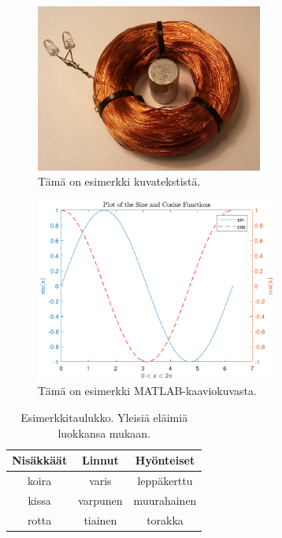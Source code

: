 \documentclass[finnish, 12pt, a4paper, elec, utf8, a-2b, online]{aaltothesis}
\begin{document}
\begin{figure}[htb]
	\centering
	\includegraphics[height=55mm]{./ledspole.jpg}
	\caption{Tämä on esimerkki kuvatekstistä.}
	\label{kuv:kela}
\end{figure}

\begin{figure}[htb]
	\centering
	\includegraphics[height=6cm]{curves.pdf}
	\caption{Tämä on esimerkki MATLAB-kaaviokuvasta. \label{kuv:matlab}}
\end{figure}

\begin{table}[htb]
	\caption{\label{tau:eläimet}Esimerkkitaulukko. Yleisiä eläimiä luokkansa
		mukaan.}
	\begin{center}
		\begin{tabular}{c|c|c}
			\hline
			\textbf{Nisäkkäät} & \textbf{Linnut} & \textbf{Hyönteiset}\\ \hline
			koira & varis & leppäkerttu \\ \hline
			kissa & varpunen & muurahainen \\ \hline
			rotta & tiainen & torakka \\ \hline  
		\end{tabular}
	\end{center}
\end{table}
\end{document}
